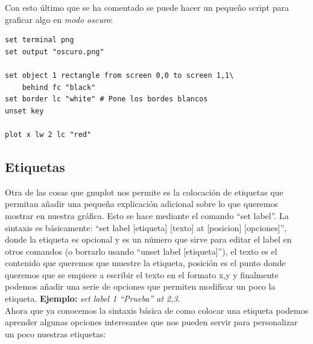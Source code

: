 \documentclass[11pt,a4paper,twoside,pdf]{article}
\numberwithin{equation}{section}
\begin{document}
Con esto último que se ha comentado se puede hacer un pequeño script para graficar algo en \textit{modo oscuro}:

\begin{lstlisting}[language=Gnuplot]
set terminal png
set output "oscuro.png"

set object 1 rectangle from screen 0,0 to screen 1,1\
	behind fc "black"
set border lc "white" # Pone los bordes blancos
unset key

plot x lw 2 lc "red"
\end{lstlisting}

\subsection{Etiquetas}

Otra de las cosas que gnuplot nos permite es la colocación de etiquetas que permitan añadir una pequeña explicación adicional sobre lo que queremos mostrar en nuestra gráfica. Esto se hace mediante el comando ``set label''. La sintaxis es básicamente: ``set label [etiqueta] [texto] at [posicion] [opciones]'', donde la etiqueta es opcional y es un número que sirve para editar el label en otros comandos (o borrarlo usando ``unset label [etiqueta]''), el texto es el contenido que queremos que muestre la etiqueta, posición es el punto donde queremos que se empiece a escribir el texto en el formato x,y y finalmente podemos añadir una serie de opciones que permiten modificar un poco la etiqueta. \textbf{Ejemplo:} \textit{set label 1 ``Prueba'' at 2,3}. \\

Ahora que ya conocemos la sintaxis básica de como colocar una etiqueta podemos aprender algunas opciones interesantes que nos pueden servir para personalizar un poco nuestras etiquetas:
\end{document}
